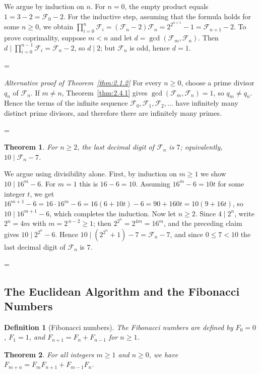 \documentclass[11pt]{article}
\makeatletter
\theoremstyle{ntstyle}
\newtheorem{theorem}{Theorem}[subsection]
\newtheorem{definition}{Definition}[subsection]
\let\nt@closedisplay\]
\def\nt@guardedclose{\@ifnextchar\par{\nt@closeafterpar}{\@ifnextchar\end{\postdisplaypenalty\@M\nt@closedisplay}{\nt@closedisplay}}}
\def\nt@closeafterpar\par{\@ifnextchar\par{\nt@closeafterpar}{\@ifnextchar\end{\postdisplaypenalty\@M\nt@closedisplay\par}{\nt@closedisplay\par}}}
\renewenvironment{proof}[1][\proofname]{\par
  \pushQED{\qed}\normalfont\topsep\medskipamount\edef\nt@afterproof{\@endparpenalty=\the\@endparpenalty\relax}\@beginparpenalty\@M\@endparpenalty\@M\let\]\nt@guardedclose\trivlist\item[]\textit{#1\@addpunct{.}} \ignorespaces}{\ifvmode\addpenalty\@M\fi\popQED\nt@afterproof\endtrivlist\@endpefalse}
\newenvironment{altproof}[1][\proofname]{\begin{proof}[#1]\renewcommand{\qedsymbol}{}}{\end{proof}}
\makeatother
\begin{document}
\begin{proof} We argue by induction on $n$. For $n=0$, the empty
	product equals $1 = 3 - 2 = \mathcal{F}_0 - 2$. For the inductive step,
	assuming that the formula holds for some $n\ge0$, we obtain
	$\prod_{i=0}^{n}\mathcal{F}_i = (\mathcal{F}_n-2)\mathcal{F}_n =
			2^{2^{n+1}} - 1 = \mathcal{F}_{n+1}-2$. To prove coprimality, suppose $m<n$ and
	let $d=\gcd(\mathcal{F}_m,\mathcal{F}_n)$. Then $d\mid \prod_{i=0}^{n-1}\mathcal{F}_i = \mathcal{F}_n - 2$, so
	$d\mid 2$; but $\mathcal{F}_n$ is odd, hence $d=1$.

\end{proof}
\begin{altproof}[Alternative proof of Theorem~\ref{thm:2.1.2}]
	For every $n\ge0$, choose a prime divisor $q_n$ of $\mathcal{F}_n$.
	If $m\neq n$, Theorem~\ref{thm:2.4.1} gives
	$\gcd(\mathcal{F}_m, \mathcal{F}_n)=1$, so $q_m\neq q_n$. Hence the terms of the
	infinite sequence $\mathcal{F}_0,\mathcal{F}_1,\mathcal{F}_2,\ldots$
	have infinitely many distinct prime divisors, and therefore there are
	infinitely many primes.

\end{altproof}
\begin{theorem}\label{thm:2.4.2} For $n\ge2$, the last
	decimal digit of $\mathcal{F}_n$ is $7$; equivalently, $10\mid
		\mathcal{F}_n-7$.

\end{theorem}

\begin{proof} We argue using divisibility alone. First, by
	induction on $m\ge1$ we show $10\mid 16^{m}-6$. For $m=1$ this is
	$16-6=10$. Assuming $16^{m}-6=10t$ for some integer $t$, we get
	$16^{m+1}-6=16\cdot16^{m}-6=16(6+10t)-6=90+160t=10(9+16t)$, so $10\mid
		16^{m+1}-6$, which completes the induction. Now let $n\ge2$. Since $4\mid
		2^{n}$, write $2^{n}=4m$ with $m=2^{\,n-2}\ge1$; then
	$2^{2^{n}}=2^{4m}=16^{m}$, and the preceding claim gives $10\mid 2^{2^{n}}-6$.
	Hence $10\mid(2^{2^{n}}+1)-7=\mathcal{F}_n-7$, and since $0\le 7<10$ the
	last decimal digit of $\mathcal{F}_n$ is $7$.

\end{proof}
\subsection{The Euclidean Algorithm and the Fibonacci Numbers}

\begin{definition}[Fibonacci numbers]\label{def:2.5.1} The Fibonacci numbers are defined by $F_0 = 0$,
	$F_1 = 1$, and $F_{n+1} = F_n + F_{n-1}$ for $n \ge 1$.

\end{definition}
\begin{theorem}\label{thm:2.5.1} For all integers
	$m \ge 1$ and $n \ge 0$, we have $F_{m+n} = F_m F_{n+1} + F_{m-1} F_n$.

\end{theorem}
\end{document}
